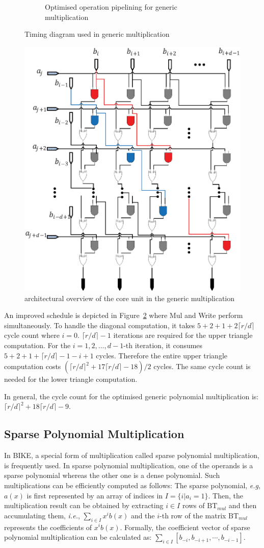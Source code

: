 \documentclass[runningheads]{llncs}
\begin{document}
\begin{figure}[!tb]
\begin{subfigure}[t]{0.47\textwidth}
\caption{Optimised operation pipelining for generic multiplication }
\label{fig:pipeline_gmul2}
\end{subfigure}
\caption{Timing diagram used in generic multiplication}
\end{figure}


\begin{figure}[!tb]
\centering
\includegraphics[width=.55\textwidth]{./fig/dsnmul_core.eps}
\caption{architectural overview of the core unit in the generic multiplication}\label{fig:gmul_core}
\end{figure}


An improved schedule is depicted in Figure~\ref{fig:pipeline_gmul2}
where Mul and Write perform simultaneously.
To handle the diagonal computation,
it takes $5+2+1+2\lceil r/d\rceil$ cycle count where $i=0$. $\lceil r/d\rceil -1$ iterations are required for the upper triangle computation.
For the $i=1,2,\ldots,d-1$-th iteration, it
consumes $5+2+1+\lceil r/d\rceil -1-i+1$ cycles.
Therefore the entire upper triangle computation costs $(\lceil r/d\rceil^2 +17\lceil r/d\rceil-18)/2$ cycles.
The same cycle count is needed for the lower triangle computation.

In general, the cycle count for the optimised generic polynomial multiplication is:
$\lceil r/d\rceil^2 + 18\lceil r/d\rceil - 9$.



\subsection{Sparse Polynomial Multiplication}
\label{sub::sparse}
In BIKE, a special form of multiplication called sparse polynomial multiplication,
is frequently used. In sparse polynomial multiplication, one of the operands
is a sparse polynomial whereas the other one is a dense polynomial.
Such multiplications can be efficiently computed as follows:
The sparse polynomial, \textit{e.g}, $a(x)$ is first represented
by an array of indices in $I=\{i|a_i=1\}$.
Then, the multiplication result can be obtained by extracting $i\in I$ rows of $\text{BT}_{mul}$ and then accumulating them, \textit{i.e.}, $\sum_{i\in I} x^ib(x)$ and the $i$-th row of the matrix $\text{BT}_{mul}$ represents the coefficients of $x^ib(x)$. Formally, the coefficient vector of sparse polynomial multiplication can be calculated as:
$\sum_{i\in I} [b_{-i},b_{-i+1},\cdots,b_{-i-1}]$.
\end{document}
